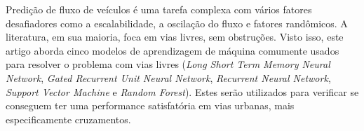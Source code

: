 
 Predição de fluxo de veículos é uma tarefa complexa com vários fatores desafiadores como a escalabilidade, a oscilação do fluxo e fatores randômicos. A literatura, em sua maioria, foca em vias livres, sem obstruções. Visto isso, este artigo aborda cinco modelos de aprendizagem de máquina comumente usados para resolver o problema com vias livres (\textit{Long Short Term Memory Neural Network}, \textit{Gated Recurrent Unit Neural Network}, \textit{Recurrent Neural Network}, \textit{Support Vector Machine} e \textit{Random Forest}). Estes serão utilizados para verificar se conseguem ter uma performance satisfatória em vias urbanas, mais especificamente cruzamentos.